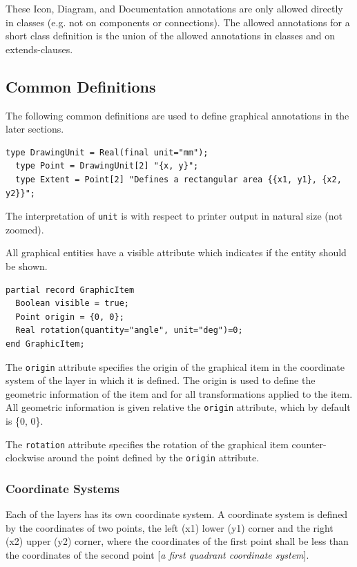 These Icon, Diagram, and Documentation annotations are only allowed
directly in classes (e.g. not on components or connections). The allowed
annotations for a short class definition is the union of the allowed
annotations in classes and on extends-clauses.

\subsection{Common Definitions}

The following common definitions are used to define graphical
annotations in the later sections.

\begin{lstlisting}[language=modelica]
  type DrawingUnit = Real(final unit="mm");
  type Point = DrawingUnit[2] "{x, y}";
  type Extent = Point[2] "Defines a rectangular area {{x1, y1}, {x2, y2}}";
\end{lstlisting}
The interpretation of \lstinline!unit! is with respect to printer output in
natural size (not zoomed).

All graphical entities have a visible attribute which indicates if the
entity should be shown.

\begin{lstlisting}[language=modelica]
partial record GraphicItem
  Boolean visible = true;
  Point origin = {0, 0};
  Real rotation(quantity="angle", unit="deg")=0;
end GraphicItem;
\end{lstlisting}
The \lstinline!origin! attribute specifies the origin of the graphical item in the
coordinate system of the layer in which it is defined. The origin is
used to define the geometric information of the item and for all
transformations applied to the item. All geometric information is given
relative the \lstinline!origin! attribute, which by default is \{0, 0\}.

The \lstinline!rotation! attribute specifies the rotation of the graphical item
counter-clockwise around the point defined by the \lstinline!origin! attribute.

\subsubsection{Coordinate Systems}

Each of the layers has its own coordinate system. A coordinate system is
defined by the coordinates of two points, the left (x1) lower (y1)
corner and the right (x2) upper (y2) corner, where the coordinates of
the first point shall be less than the coordinates of the second point
{[}\emph{a first quadrant coordinate system}{]}.

